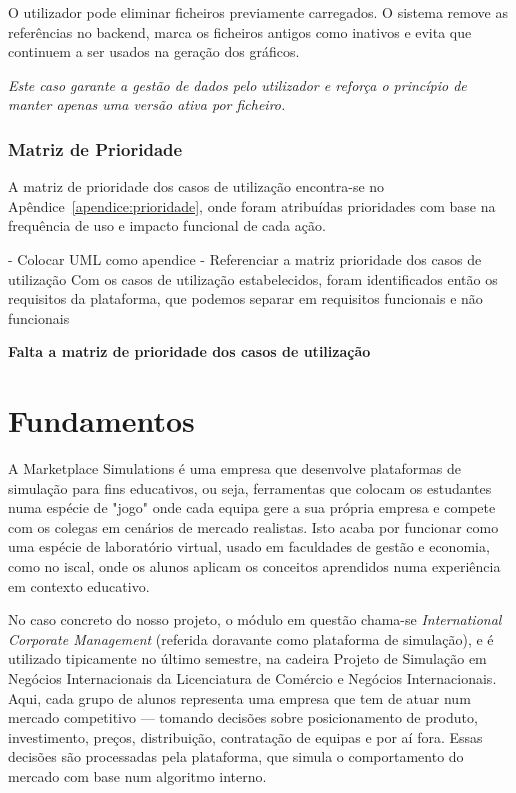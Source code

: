 O utilizador pode eliminar ficheiros previamente carregados. O sistema remove as referências no backend, marca os ficheiros antigos como inativos e evita que continuem a ser usados na geração dos gráficos.

\textit{Este caso garante a gestão de dados pelo utilizador e reforça o princípio de manter apenas uma versão ativa por ficheiro.}

\subsubsection{Matriz de Prioridade}

A matriz de prioridade dos casos de utilização encontra-se no Apêndice~\ref{apendice:prioridade}, onde foram atribuídas prioridades com base na frequência de uso e impacto funcional de cada ação.


- Colocar UML como apendice
- Referenciar a matriz prioridade dos casos de utilização
Com os casos de utilização estabelecidos, foram identificados então os requisitos da plataforma, que podemos separar em requisitos funcionais e não funcionais

\textbf{ Falta a matriz de prioridade dos casos de utilização}

\section{Fundamentos}
\label{sec:fundamentos}

A Marketplace Simulations  é uma empresa que desenvolve plataformas de simulação para fins educativos, ou seja, ferramentas que colocam os estudantes numa espécie de "jogo" onde cada equipa gere a sua própria empresa e compete com os colegas em cenários de mercado realistas. Isto acaba por funcionar como uma espécie de laboratório virtual, usado em faculdades de gestão e economia, como no \gls{iscal}, onde os alunos aplicam os conceitos aprendidos numa experiência em contexto educativo.

No caso concreto do nosso projeto, o módulo em questão chama-se \textit{International Corporate Management} (referida doravante como plataforma de simulação), e é utilizado tipicamente no último semestre, na cadeira Projeto de Simulação em Negócios Internacionais  da Licenciatura de Comércio e Negócios Internacionais. Aqui, cada grupo de alunos representa uma empresa que tem de atuar num mercado competitivo — tomando decisões sobre posicionamento de produto, investimento, preços, distribuição, contratação de equipas e por aí fora. Essas decisões são processadas pela plataforma, que simula o comportamento do mercado com base num algoritmo interno. 

